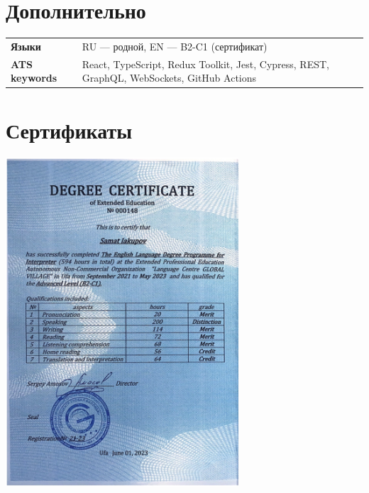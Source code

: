 \documentclass[a4paper,12pt]{article}
\begin{document}
\section{Дополнительно}
\begin{tabularx}{\linewidth}{@{}l X@{}}
\textbf{Языки} & \small{RU — родной, EN — B2-C1 (сертификат)} \\[2pt]
\textbf{ATS keywords} & \small{React, TypeScript, Redux Toolkit, Jest, Cypress, REST, GraphQL, WebSockets, GitHub Actions} \\
\end{tabularx}

\section{Сертификаты}
\begin{center}
\includegraphics[width=0.65\textwidth]{cert.png}
\end{center}

\vfill
{}
\end{document}
